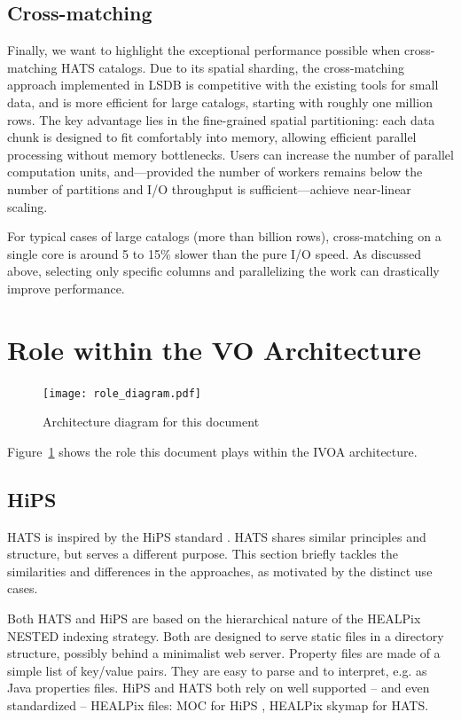 \documentclass[11pt,a4paper]{ivoa}
\begin{document}
\subsection{Cross-matching}
Finally, we want to highlight the exceptional performance possible when cross-matching HATS catalogs. 
Due to its spatial sharding, the cross-matching approach implemented in LSDB is competitive with the existing tools for small data, and is more efficient for large catalogs, starting with roughly one million rows. 
The key advantage lies in the fine-grained spatial partitioning: each data chunk is designed to fit comfortably into memory, allowing efficient parallel processing without memory bottlenecks. Users can increase the number of parallel computation units, and—provided the number of workers remains below the number of partitions and I/O throughput is sufficient—achieve near-linear scaling. \par 

For typical cases of large catalogs (more than billion rows), cross-matching on a single core is around 5 to 15\% slower than the pure I/O speed. 
As discussed above, selecting only specific columns and parallelizing the work can drastically improve performance.   

\section{Role within the VO Architecture}

\begin{figure}
\centering

\texttt{[image: role\_diagram.pdf]}
\caption{Architecture diagram for this document}
\label{fig:archdiag}
\end{figure}

Figure~\ref{fig:archdiag} shows the role this document plays within the IVOA architecture.

\subsection{HiPS}

HATS is inspired by the HiPS standard \citep{ivoa:HIPS}.
HATS shares similar principles and structure, but serves a different purpose.
This section briefly tackles the similarities and differences in the approaches, as motivated by the distinct use cases.

Both HATS and HiPS are based on the hierarchical nature of the HEALPix NESTED indexing strategy.
Both are designed to serve static files in a directory structure, possibly behind a minimalist web server.
Property files are made of a simple list of key/value pairs. They are easy to parse and to interpret, e.g. as Java properties files.
HiPS and HATS both rely on well supported -- and even standardized -- HEALPix files: MOC  \citep{ivoa:MOC} for HiPS , HEALPix skymap for HATS.
\end{document}
